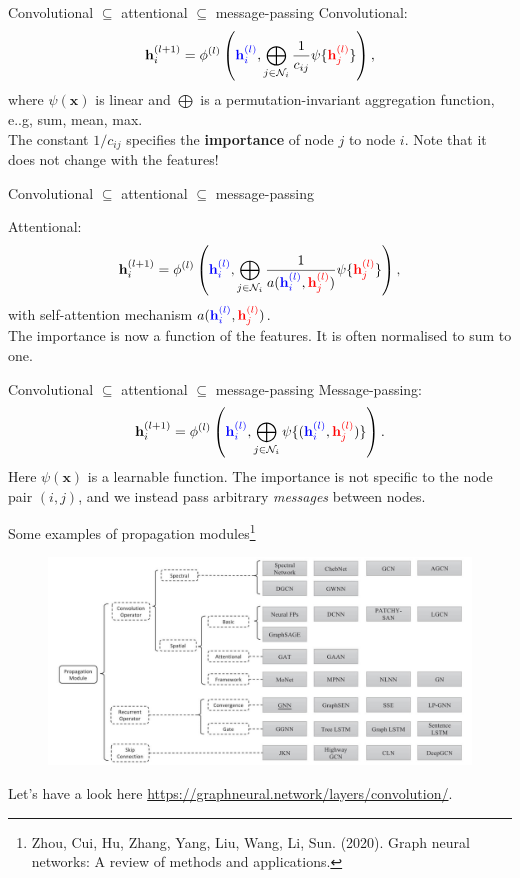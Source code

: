 \documentclass{beamer}
\begin{document}
\begin{frame}{Convolutional $\subseteq$ attentional $\subseteq$ message-passing}
Convolutional:
\[
\mathbf{h}_i^{(l+1)}=\phi^{(l)}\left({\color{blue}\mathbf{h}_i^{(l)}},\bigoplus_{j\in\mathcal{N}_i}\frac{1}{c_{ij}}\psi\{{\color{red}\mathbf{h}_j^{(l)}}\}\right),
\]
where $\psi(\mathbf{x})$ is linear and $\bigoplus$ is a permutation-invariant aggregation function, e..g, sum, mean, max.\\
The constant $1/c_{ij}$ specifies the \textbf{importance}  of node $j$ to node $i$. Note that it does not change with the features!

\end{frame}
\begin{frame}{Convolutional $\subseteq$ attentional $\subseteq$ message-passing}

Attentional:
\[
\mathbf{h}_i^{(l+1)}=\phi^{(l)}\left({\color{blue}\mathbf{h}_i^{(l)}},\bigoplus_{j\in\mathcal{N}_i}\frac{1}{a({\color{blue}\mathbf{h}_i^{(l)}},{\color{red}\mathbf{h}_j^{(l)}})}\psi\{{\color{red}\mathbf{h}_j^{(l)}}\}\right),
\]
with self-attention mechanism $a({\color{blue}\mathbf{h}_i^{(l)}},{\color{red}\mathbf{h}_j^{(l)}})$.\\ The importance is now a function of the features. It is often normalised to sum to one.
\end{frame}
\begin{frame}{Convolutional $\subseteq$ attentional $\subseteq$ message-passing}
Message-passing:
\[
\mathbf{h}_i^{(l+1)}=\phi^{(l)}\left({\color{blue}\mathbf{h}_i^{(l)}},\bigoplus_{j\in\mathcal{N}_i}\psi\{({\color{blue}\mathbf{h}_i^{(l)}},{\color{red}\mathbf{h}_j^{(l)}})\}\right).
\]
Here $\psi(\mathbf{x})$ is a learnable function. The importance is not specific to the node pair $(i,j)$, and we instead pass arbitrary \textit{messages} between nodes.

\end{frame}
\begin{frame}{Some examples of propagation modules\footnote{Zhou, Cui, Hu, Zhang, Yang, Liu, Wang, Li, Sun. (2020).
Graph neural networks: A review of methods and applications.}}
\begin{figure}
\includegraphics[width=0.85\linewidth]{Images/GNN-variants.jpg}
\end{figure}
Let's have a look here \url{https://graphneural.network/layers/convolution/}.
\end{frame}
\end{document}
